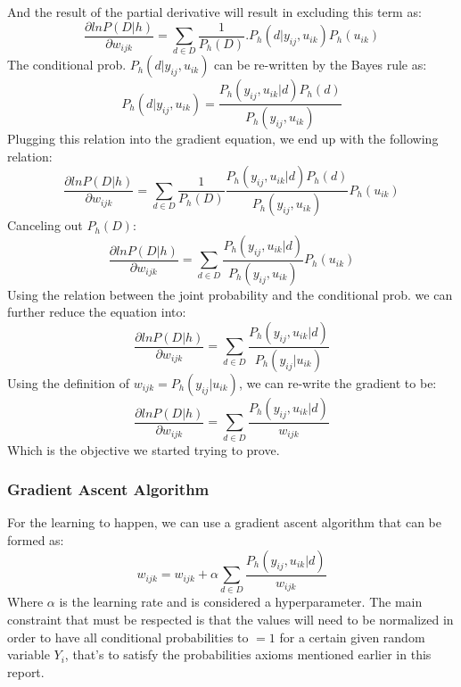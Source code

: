 \documentclass{article}
\begin{document}
And the result of the partial derivative will result in excluding this term as:
\begin{equation}
\frac{\partial ln P(D|h)}{\partial w_{ijk}} = \sum_{d \in D} \frac{1}{P_h(D)} . P_h(d|y_{ij}, u_{ik}) P_h(u_{ik})
\end{equation}
The conditional prob. $P_h(d|y_{ij}, u_{ik})$ can be re-written by the Bayes rule as: 
\begin{equation}
P_h(d|y_{ij}, u_{ik}) = \frac{P_h(y_{ij}, u_{ik} |d) P_h(d)}{P_h(y_{ij}, u_{ik})}
\end{equation}
Plugging this relation into the gradient equation, we end up with the following relation:
\begin{equation}
\frac{\partial ln P(D|h)}{\partial w_{ijk}} = \sum_{d \in D} \frac{1}{P_h(D)} \frac{P_h(y_{ij}, u_{ik} |d) P_h(d)}{P_h(y_{ij}, u_{ik})} P_h(u_{ik})
\end{equation}
Canceling out $P_h(D)$:
\begin{equation}
\frac{\partial ln P(D|h)}{\partial w_{ijk}} = \sum_{d \in D} \frac{P_h(y_{ij}, u_{ik} |d)}{P_h(y_{ij}, u_{ik})} P_h(u_{ik})
\end{equation}
Using the relation between the joint probability and the conditional prob. we can further reduce the equation into:
\begin{equation}
\frac{\partial ln P(D|h)}{\partial w_{ijk}} = \sum_{d \in D} \frac{P_h(y_{ij}, u_{ik} |d)}{P_h(y_{ij}| u_{ik})}
\end{equation}
Using the definition of $w_{ijk} = P_h(y_{ij}| u_{ik})$, we can re-write the gradient to be:
\begin{equation}
\frac{\partial ln P(D|h)}{\partial w_{ijk}} = \sum_{d \in D} \frac{P_h(y_{ij}, u_{ik} |d)}{w_{ijk}}
\end{equation}
Which is the objective we started trying to prove. \\

\subsubsection{Gradient Ascent Algorithm}
For the learning to happen, we can use a gradient ascent algorithm that can be formed as:
\begin{equation}
w_{ijk} = w_{ijk} + \alpha \sum_{d \in D} \frac{P_h(y_{ij}, u_{ik} |d)}{w_{ijk}}
\end{equation}
Where $\alpha$ is the learning rate and is considered a hyperparameter. The main constraint that must be respected is that the values will need to be normalized in order to have all conditional probabilities to $=1$ for a certain given random variable $Y_i$, that's to satisfy the probabilities axioms mentioned earlier in this report.
\end{document}
